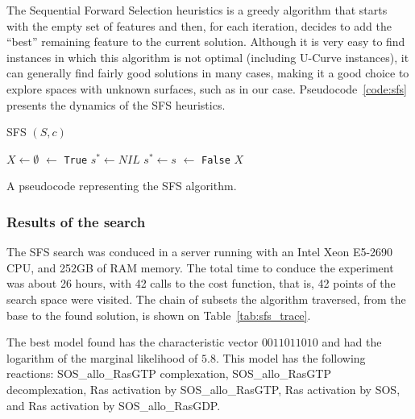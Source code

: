 The Sequential Forward Selection heuristics is a greedy algorithm that
starts with the empty set of features and then, for each iteration,
decides to add the ``best'' remaining feature to the current solution.
Although it is very easy to find instances in which this algorithm is
not optimal (including U-Curve instances), it can generally find  fairly
good solutions in many cases, making it a good choice to explore spaces
with unknown surfaces, such as in our case. Pseudocode~\ref{code:sfs}
presents the dynamics of the SFS heuristics.

\begin{algorithm}[H]
\textsc{SFS} $(S, c)$
\begin{algorithmic}[1]
    \State $X \gets \emptyset$
     $\gets$ {\tt True}
        \State $s^* \gets NIL$
                \State $s^* \gets s$
            \EndIf
        \EndFor
             $\gets$ {\tt False}
        \EndIf
    \EndWhile
    \Return $X$
\end{algorithmic}
\caption{A pseudocode representing the SFS algorithm.}
\label{code:sfs}
\end{algorithm}


\subsubsection{Results of the search}
The SFS search was conduced in a server running with an Intel 
Xeon E5-2690 CPU, and 252GB of RAM memory. The total time to conduce the
experiment was about 26 hours, with 42 calls to the cost function, that
is, 42 points of the search space were visited. The chain of subsets the
algorithm traversed, from the base to the found solution, is shown on 
Table~\ref{tab:sfs_trace}.

The best model found has the characteristic vector $0011011010$ and had 
the logarithm of the marginal likelihood of $5.8$. This model has the 
following reactions: SOS\_allo\_RasGTP complexation, SOS\_allo\_RasGTP
decomplexation, Ras activation by SOS\_allo\_RasGTP, Ras activation
by SOS, and Ras activation by SOS\_allo\_RasGDP.


